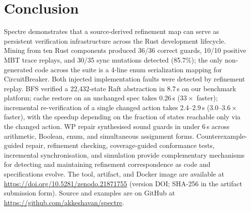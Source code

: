 \documentclass[runningheads]{llncs}
\begin{document}
\section{Conclusion}\label{sec:conclusion}

Spectre demonstrates that a source-derived refinement map can serve as
persistent verification infrastructure across the Rust development lifecycle.
Mining from ten Rust components produced 36/36 correct guards, 10/10 positive
MBT trace replays, and 30/35 sync mutations detected (85.7\%); the only
non-generated code across the suite is a 4-line enum serialization mapping
for CircuitBreaker.
Both injected implementation faults were detected by refinement replay.
BFS verified a 22{,}432-state Raft abstraction in 8.7\,s on our benchmark platform;
cache restore on an unchanged spec takes 0.26\,s ($33\times$ faster);
incremental re-verification of a single changed action takes 2.4--2.9\,s
($3.0$--$3.6\times$ faster), with the speedup depending on the fraction
of states reachable only via the changed action.
WP repair synthesised sound guards in under 6\,s across arithmetic, Boolean,
enum, and simultaneous assignment forms.
Counterexample-guided repair, refinement checking, coverage-guided conformance
tests, incremental synchronisation, and simulation provide complementary
mechanisms for detecting and maintaining refinement correspondence as code
and specifications evolve.
The tool, artifact, and Docker image are available at
\url{https://doi.org/10.5281/zenodo.21871755} (version DOI; SHA-256 in
the artifact submission form).  Source and examples are on GitHub at
\url{https://github.com/akkeshavan/spectre}.



\end{document}
